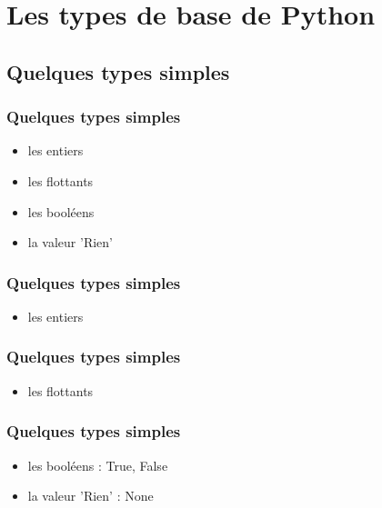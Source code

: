 \section{Les types de base de Python}
\subsection{Quelques types simples}

\begin{frame}
  \frametitle{Quelques types simples}
  \begin{itemize}
    \item<1-> les entiers
    \item<2-> les flottants
    \item<3-> les booléens
    \item<4-> la valeur 'Rien'
  \end{itemize}
\end{frame}

\begin{frame}[fragile]
  \frametitle{Quelques types simples}
    \begin{itemize}
      \item les entiers
    \end{itemize}
    \begin{ipython}
    \end{ipython}
\end{frame}

\begin{frame}[fragile]
  \frametitle{Quelques types simples}
    \begin{itemize}
      \item les flottants
    \end{itemize}
    \begin{ipython}
    \end{ipython}
\end{frame}

\begin{frame}
  \frametitle{Quelques types simples}
    \begin{itemize}
      \item les booléens : \alert{True, False}
      \item la valeur 'Rien' : \alert{None}
    \end{itemize}
\end{frame}


